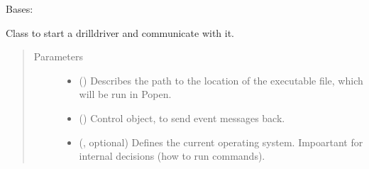 \documentclass[letterpaper,10pt,english]{sphinxmanual}
\begin{document}
\begin{fulllineitems}
\label{\detokenize{anoog.automation:anoog.automation.py_exe_interface.Drilldriver_Interface}}
\sphinxAtStartPar
Bases: {\hyperref[\detokenize{anoog.automation:anoog.automation.py_exe_interface.Process_Interface}]{}}

\sphinxAtStartPar
Class to start a drilldriver and communicate with it.
\begin{quote}\begin{description}
\item[{Parameters}] \leavevmode\begin{itemize}
\item {} 
\sphinxAtStartPar
{} () \textendash{} Describes the path to the location of the executable file, which will be run in Popen.

\item {} 
\sphinxAtStartPar
{} ({\hyperref[\detokenize{anoog.automation:anoog.automation.controller.Terminal}]{}}) \textendash{} Control object, to send event messages back.

\item {} 
\sphinxAtStartPar
{} ({\hyperref[\detokenize{anoog.automation:anoog.automation.py_exe_interface.op}]{}}, optional) \textendash{} Defines the current operating system. Impoartant for internal decisions (how to run commands).

\end{itemize}

\end{description}\end{quote}


\end{fulllineitems}
\end{document}
